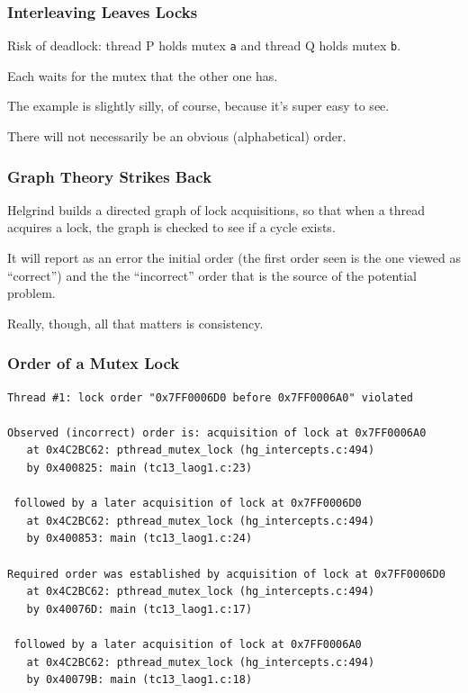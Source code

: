 \begin{frame}
\frametitle{Interleaving Leaves Locks}

Risk of deadlock: thread P holds mutex \texttt{a} and thread Q holds mutex \texttt{b}. 

Each waits for the mutex that the other one has. 

The example is slightly silly, of course, because it's super easy to see. 

There will not necessarily be an obvious (alphabetical) order.

\end{frame}

\begin{frame}
\frametitle{Graph Theory Strikes Back}


Helgrind builds a directed graph of lock acquisitions, so that when a thread acquires a lock, the graph is checked to see if a cycle exists. 

  It will report as an error the initial order (the first order seen is the one viewed as ``correct'') and the the ``incorrect'' order that is the source of the potential problem. 
  
  Really, though, all that matters is consistency.

\end{frame}

\begin{frame}[fragile]
\frametitle{Order of a Mutex Lock}
{\scriptsize
\begin{verbatim}
Thread #1: lock order "0x7FF0006D0 before 0x7FF0006A0" violated

Observed (incorrect) order is: acquisition of lock at 0x7FF0006A0
   at 0x4C2BC62: pthread_mutex_lock (hg_intercepts.c:494)
   by 0x400825: main (tc13_laog1.c:23)

 followed by a later acquisition of lock at 0x7FF0006D0
   at 0x4C2BC62: pthread_mutex_lock (hg_intercepts.c:494)
   by 0x400853: main (tc13_laog1.c:24)

Required order was established by acquisition of lock at 0x7FF0006D0
   at 0x4C2BC62: pthread_mutex_lock (hg_intercepts.c:494)
   by 0x40076D: main (tc13_laog1.c:17)

 followed by a later acquisition of lock at 0x7FF0006A0
   at 0x4C2BC62: pthread_mutex_lock (hg_intercepts.c:494)
   by 0x40079B: main (tc13_laog1.c:18)
\end{verbatim}
}

\end{frame}

